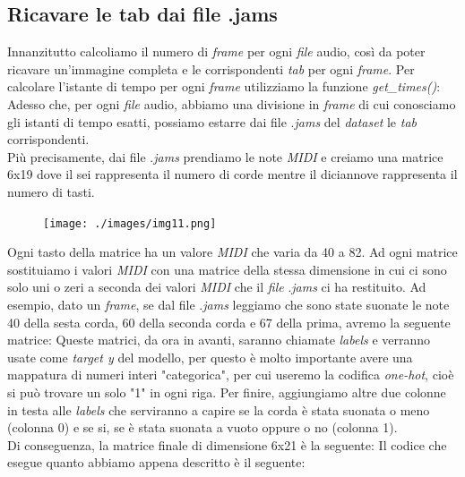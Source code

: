 \subsection{Ricavare le tab dai file .jams}
Innanzitutto calcoliamo il numero di \textit{frame} per ogni \textit{file} audio, così da poter ricavare un'immagine completa e le corrispondenti \textit{tab} per ogni \textit{frame}. Per calcolare l'istante di tempo per ogni \textit{frame} utilizziamo la funzione \textit{get\_times()}:
\vspace*{2ex}
\vspace*{2ex}
\noindent Adesso che, per ogni \textit{file} audio, abbiamo una divisione in \textit{frame} di cui conosciamo gli istanti di tempo esatti, possiamo estarre dai file .\textit{jams} del \textit{dataset} le \textit{tab} corrispondenti.\\ Più precisamente, dai file .\textit{jams} prendiamo le note \textit{MIDI} e creiamo una matrice 6x19 dove il sei rappresenta il numero di corde mentre il diciannove rappresenta il numero di tasti.
\vspace*{2ex}
\begin{figure}[H]
	\centering
	\texttt{[image: ./images/img11.png]}
\end{figure}
\noindent Ogni tasto della matrice ha un valore \textit{MIDI} che varia da 40 a 82.
\vspace*{2ex}
\vspace*{2ex}
\noindent Ad ogni matrice sostituiamo i valori \textit{MIDI} con una matrice della stessa dimensione in cui ci sono solo uni o zeri a seconda dei valori \textit{MIDI} che il \textit{file} .\textit{jams} ci ha restituito. Ad esempio, dato un \textit{frame}, se dal file .\textit{jams} leggiamo che sono state suonate le note 40 della sesta corda, 60 della seconda corda e 67 della prima, avremo la seguente matrice:
\vspace*{2ex}
\noindent Queste matrici, da ora in avanti, saranno chiamate \textit{labels} e verranno usate come \textit{target y} del modello, per questo è molto importante avere una mappatura di numeri interi "categorica", per cui useremo la codifica \textit{one-hot}, cioè si può trovare un solo "1" in ogni riga. Per finire, aggiungiamo altre due colonne in testa alle \textit{labels} che serviranno a capire se la corda è stata suonata o meno (colonna 0) e se si, se è stata suonata a vuoto oppure o no (colonna 1).\\
\newline
Di conseguenza, la matrice finale di dimensione 6x21 è la seguente:
\vspace*{2ex}
\vspace*{2ex}
\noindent Il codice che esegue quanto abbiamo appena descritto è il seguente:
\vspace*{2ex}
